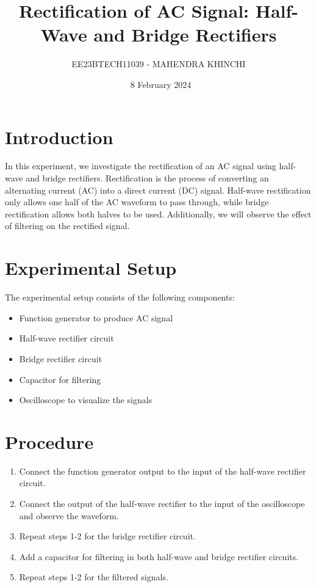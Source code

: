 \documentclass{article}
\title{Rectification of AC Signal: Half-Wave and Bridge Rectifiers}
\author{EE23BTECH11039 - MAHENDRA KHINCHI}
\date{\ 8 February 2024}
\begin{document}
\maketitle

\section{Introduction}
In this experiment, we investigate the rectification of an AC signal using half-wave and bridge rectifiers. Rectification is the process of converting an alternating current (AC) into a direct current (DC) signal. Half-wave rectification only allows one half of the AC waveform to pass through, while bridge rectification allows both halves to be used. Additionally, we will observe the effect of filtering on the rectified signal.

\section{Experimental Setup}
The experimental setup consists of the following components:
\begin{itemize}
    \item Function generator to produce AC signal
    \item Half-wave rectifier circuit
    \item Bridge rectifier circuit
    \item Capacitor for filtering
    \item Oscilloscope to visualize the signals
\end{itemize}

\section{Procedure}
\begin{enumerate}
    \item Connect the function generator output to the input of the half-wave rectifier circuit.
    \item Connect the output of the half-wave rectifier to the input of the oscilloscope and observe the waveform.
    \item Repeat steps 1-2 for the bridge rectifier circuit.
    \item Add a capacitor for filtering in both half-wave and bridge rectifier circuits.
    \item Repeat steps 1-2 for the filtered signals.
\end{enumerate}
\end{document}
